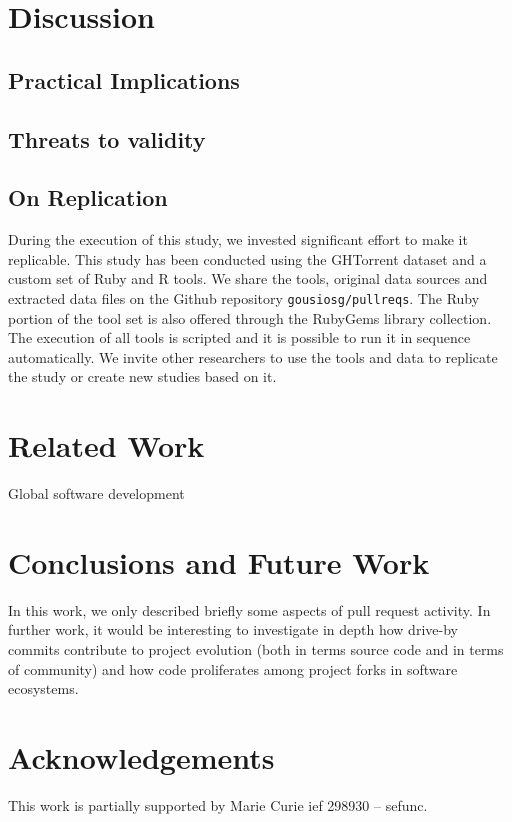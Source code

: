 \documentclass{sig-alternate}
\begin{document}
\section{Discussion}
\label{sec:discussion}

\subsection{Practical Implications}

\subsection{Threats to validity}

\subsection{On Replication}

During the execution of this study, we invested significant effort to
make it replicable.  This study has been conducted using the GHTorrent dataset
and a custom set of Ruby and R tools. We share the tools, original data sources
and extracted data files on the Github repository \texttt{gousiosg/pullreqs}.
The Ruby portion of the tool set is also offered through the RubyGems library
collection. The execution of all tools is scripted and it is possible to run it
in sequence automatically. We invite other researchers to use the tools and data
to replicate the study or create new studies based on it.

\section{Related Work}

\cite{Bird09}
\cite{Cornf10}
\cite{Dabbi12}
\cite{Bird12}
\cite{Barr12}
\cite{Buffe99}
\cite{Mens02}
\cite{Shiha12}

Global software development
\section{Conclusions and Future Work}

In this work, we only described briefly some aspects of pull request activity.
In further work, it would be interesting to investigate in depth how drive-by
commits contribute to project evolution (both in terms source code and in
terms of community) and how code proliferates among project
forks in software ecosystems.

\section*{Acknowledgements}
This work is partially supported by Marie Curie {\sc ief} 298930 -- {\sc sefunc}.



\end{document}
